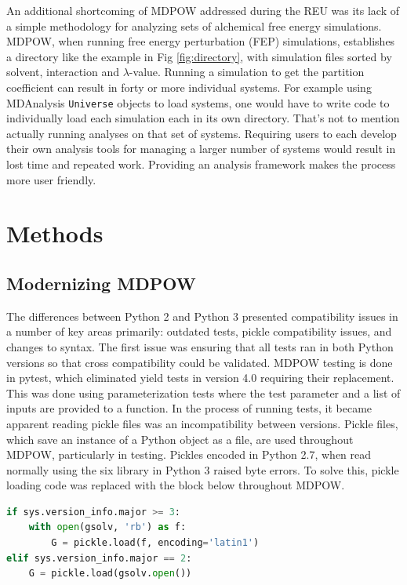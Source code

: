 \documentclass{article}[letterpaper, margins=1in, 12pt]
\begin{document}
An additional shortcoming of MDPOW addressed during the REU was its lack of a simple methodology for analyzing sets of alchemical free energy simulations. MDPOW, when running free energy perturbation (FEP) simulations, establishes a directory like the example in Fig \ref{fig:directory}, with simulation files sorted by solvent, interaction and $\lambda$-value. Running a simulation to get the partition coefficient can result in forty or more individual systems. For example using MDAnalysis \texttt{Universe} objects to load systems, one would have to write code to individually load each simulation each in its own directory. That's not to mention actually running analyses on that set of systems. Requiring users to each develop their own analysis tools for managing a larger number of systems would result in lost time and repeated work. Providing an analysis framework makes the process more user friendly.

\section{Methods}
\subsection{Modernizing MDPOW}

The differences between Python 2 and Python 3 presented compatibility issues in a number of key areas primarily: outdated tests, pickle compatibility issues, and changes to syntax. The first issue was ensuring that all tests ran in both Python versions so that cross compatibility could be validated. MDPOW testing is done in pytest, which eliminated yield tests in version 4.0 requiring their replacement. This was done using parameterization tests where the test parameter and a list of inputs are provided to a function. In the process of running tests, it became apparent reading pickle files was an incompatibility between versions. Pickle files, which save an instance of a Python object as a file, are used throughout MDPOW, particularly in testing. Pickles encoded in Python 2.7, when read normally using the six library in Python 3 raised byte errors. To solve this, pickle loading code was replaced with the block below throughout MDPOW. 

\begin{lstlisting}[language=Python]
if sys.version_info.major >= 3:
	with open(gsolv, 'rb') as f:
		G = pickle.load(f, encoding='latin1')
elif sys.version_info.major == 2:
	G = pickle.load(gsolv.open())
\end{lstlisting}
\end{document}
